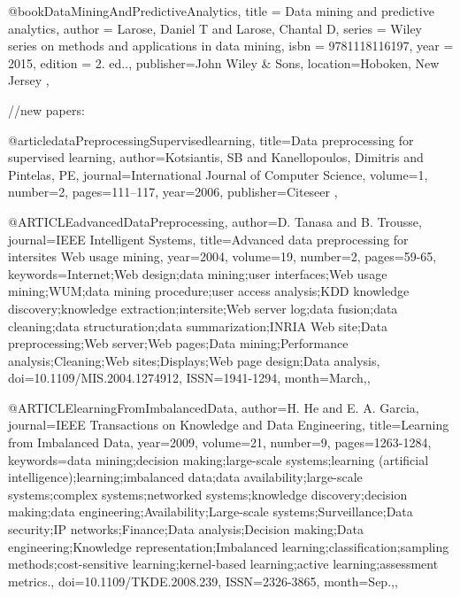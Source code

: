 @book{DataMiningAndPredictiveAnalytics,
title = {Data mining and predictive analytics},
author = {Larose, Daniel T and Larose, Chantal D},
series = {Wiley series on methods and applications in data mining},
isbn = {9781118116197},
year = {2015},
edition = {2. ed..},
publisher={John Wiley \& Sons},
location={Hoboken, New Jersey}
},











//new papers:

@article{dataPreprocessingSupervisedlearning,
  title={Data preprocessing for supervised learning},
  author={Kotsiantis, SB and Kanellopoulos, Dimitris and Pintelas, PE},
  journal={International Journal of Computer Science},
  volume={1},
  number={2},
  pages={111--117},
  year={2006},
  publisher={Citeseer}
},

@ARTICLE{advancedDataPreprocessing, 
author={D. {Tanasa} and B. {Trousse}}, 
journal={IEEE Intelligent Systems}, 
title={Advanced data preprocessing for intersites Web usage mining}, 
year={2004}, 
volume={19}, 
number={2}, 
pages={59-65}, 
keywords={Internet;Web design;data mining;user interfaces;Web usage mining;WUM;data mining procedure;user access analysis;KDD knowledge discovery;knowledge extraction;intersite;Web server log;data fusion;data cleaning;data structuration;data summarization;INRIA Web site;Data preprocessing;Web server;Web pages;Data mining;Performance analysis;Cleaning;Web sites;Displays;Web page design;Data analysis}, 
doi={10.1109/MIS.2004.1274912}, 
ISSN={1941-1294}, 
month={March},},

@ARTICLE{learningFromImbalancedData, 
author={H. {He} and E. A. {Garcia}}, 
journal={IEEE Transactions on Knowledge and Data Engineering}, 
title={Learning from Imbalanced Data}, 
year={2009}, 
volume={21}, 
number={9}, 
pages={1263-1284}, 
keywords={data mining;decision making;large-scale systems;learning (artificial intelligence);learning;imbalanced data;data availability;large-scale systems;complex systems;networked systems;knowledge discovery;decision making;data engineering;Availability;Large-scale systems;Surveillance;Data security;IP networks;Finance;Data analysis;Decision making;Data engineering;Knowledge representation;Imbalanced learning;classification;sampling methods;cost-sensitive learning;kernel-based learning;active learning;assessment metrics.}, 
doi={10.1109/TKDE.2008.239}, 
ISSN={2326-3865}, 
month={Sep.},},

